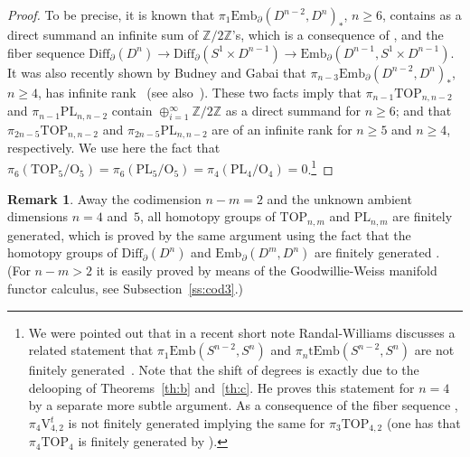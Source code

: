 \documentclass[11pt]{amsart}
\theoremstyle{definition}
\newtheorem{remark}[theorem]{Remark}
\newcommand{\Z}{{\mathbb Z}}
\newcommand{\Emb}{\mathrm{Emb}}
\newcommand{\tEmb}{\mathrm{tEmb}}
\newcommand{\Diffn}{\mathrm{Diff}_\partial(D^n)}
\newcommand{\Diff}{\mathrm{Diff}}
\newcommand{\PL}{\mathrm{PL}}
\newcommand{\TOP}{\mathrm{TOP}}
\newcommand{\OO}{\mathrm{O}}
\newcommand{\VV}{\mathrm{V}}
\numberwithin{equation}{section}
\begin{document}
\begin{proof}
To be precise, it is known that $\pi_1\Emb_\partial(D^{n-2},D^n)_*$, $n\geq 6$, contains as a direct summand an infinite sum of $\Z/2\Z$'s, which is a consequence of 
\cite[Corollary~5.5 (p.273), Corollary 4.6 (p.270), Note on p.230]{HW}, \cite[Corollary~3.11]{BG1} and the fiber sequence $\Diffn\to \Diff_\partial(S^1\times D^{n-1})\to \Emb_\partial(D^{n-1},S^1\times D^{n-1})$. It was also recently shown by Budney and Gabai that $\pi_{n-3}\Emb_\partial(D^{n-2},D^n)_*$, $n\geq 4$, has  infinite rank~\cite[Section~3]{BG2} (see also~\cite{Yoshioka}). These two facts imply that  $\pi_{n-1}\TOP_{n,n-2}$ and $\pi_{n-1}\PL_{n,n-2}$ contain $\oplus_{i=1}^\infty\Z/2\Z$ as a direct summand for $n\geq 6$; and that 
$\pi_{2n-5}\TOP_{n,n-2}$ and $\pi_{2n-5}\PL_{n,n-2}$ are of an infinite rank for $n\geq 5$ and $n\geq 4$, respectively. 
We use here the fact that $\pi_6(\TOP_5/\OO_5)=\pi_6(\PL_5/\OO_5)=\pi_4(\PL_4/\OO_4)=0$.\footnote{We were pointed out that in a recent short note Randal-Williams discusses a related statement that $\pi_1\Emb(S^{n-2},S^n)$ and $\pi_n\tEmb(S^{n-2},S^n)$ are not finitely generated~\cite{Randal_S2_S4}. Note that the shift of degrees is exactly due to the delooping of Theorems~\ref{th:b} and~\ref{th:c}. He proves this statement for $n=4$ by a separate more subtle argument. As a consequence of the fiber sequence \cite[Equation~(*)]{Randal_S2_S4}, $\pi_4\VV_{4,2}^t$ is not finitely generated implying the same
for $\pi_3\TOP_{4,2}$ (one has that  %
 $\pi_4\TOP_4$ is finitely generated by \cite[Theorem~8.7A]{FQ}).\label{foot5}}
\end{proof}

\begin{remark}\label{r:fg}
Away the codimension $n-m=2$ and the unknown ambient dimensions $n=4$ and~$5$, all homotopy groups of $\TOP_{n,m}$ and $\PL_{n,m}$ are finitely generated, which is proved by the same argument using the fact that the homotopy groups of $\Diff_\partial(D^n)$ and $\Emb_\partial(D^m,D^n)$ are finitely generated \cite{Kupers,KraKup}. (For $n-m>2$ it is easily proved by means of the Goodwillie-Weiss manifold functor calculus, see Subsection~\ref{ss:cod3}.)
\end{remark}
\end{document}
